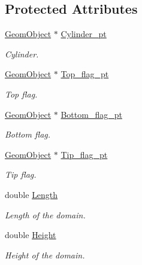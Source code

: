 \subsection*{Protected Attributes}
\begin{DoxyCompactItemize}
\item 
\hyperlink{classoomph_1_1GeomObject}{Geom\+Object} $\ast$ \hyperlink{classoomph_1_1AlgebraicCylinderWithFlagMesh_a423d4aa7ffcca5e707b2e5d820984957}{Cylinder\+\_\+pt}
\begin{DoxyCompactList}\small\item\em Cylinder. \end{DoxyCompactList}\item 
\hyperlink{classoomph_1_1GeomObject}{Geom\+Object} $\ast$ \hyperlink{classoomph_1_1AlgebraicCylinderWithFlagMesh_a326e4789fe96b3052a8beb51ec9e94d0}{Top\+\_\+flag\+\_\+pt}
\begin{DoxyCompactList}\small\item\em Top flag. \end{DoxyCompactList}\item 
\hyperlink{classoomph_1_1GeomObject}{Geom\+Object} $\ast$ \hyperlink{classoomph_1_1AlgebraicCylinderWithFlagMesh_ac1f7e1ba183ba813229302c5688ea1ba}{Bottom\+\_\+flag\+\_\+pt}
\begin{DoxyCompactList}\small\item\em Bottom flag. \end{DoxyCompactList}\item 
\hyperlink{classoomph_1_1GeomObject}{Geom\+Object} $\ast$ \hyperlink{classoomph_1_1AlgebraicCylinderWithFlagMesh_ad22c8bfa595f4b1f129be85a1904762f}{Tip\+\_\+flag\+\_\+pt}
\begin{DoxyCompactList}\small\item\em Tip flag. \end{DoxyCompactList}\item 
double \hyperlink{classoomph_1_1AlgebraicCylinderWithFlagMesh_a7620fa5a4c36f638fb22c81b346b74a2}{Length}
\begin{DoxyCompactList}\small\item\em Length of the domain. \end{DoxyCompactList}\item 
double \hyperlink{classoomph_1_1AlgebraicCylinderWithFlagMesh_a29a0c970a11d46bdf03f3b5053d3ece2}{Height}
\begin{DoxyCompactList}\small\item\em Height of the domain. \end{DoxyCompactList}\item 

\end{DoxyCompactItemize}
